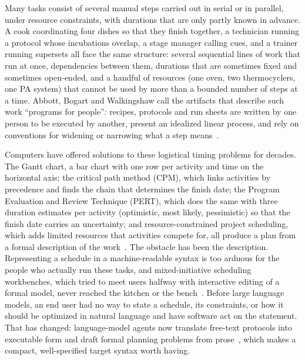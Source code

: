 \documentclass[10pt]{article}
\begin{document}
Many tasks consist of several manual steps carried out in serial or in parallel, under resource constraints, with durations that are only partly known in advance. A cook coordinating four dishes so that they finish together, a technician running a protocol whose incubations overlap, a stage manager calling cues, and a trainer running supersets all face the same structure: several sequential lines of work that run at once, dependencies between them, durations that are sometimes fixed and sometimes open-ended, and a handful of resources (one oven, two thermocyclers, one PA system) that cannot be used by more than a bounded number of steps at a time. Abbott, Bogart and Walkingshaw call the artifacts that describe such work ``programs for people'': recipes, protocols and run sheets are written by one person to be executed by another, present an idealized linear process, and rely on conventions for widening or narrowing what a step means~\cite{abbott2015programs}.

Computers have offered solutions to these logistical timing problems for decades. The Gantt chart, a bar chart with one row per activity and time on the horizontal axis; the critical path method (CPM), which links activities by precedence and finds the chain that determines the finish date; the Program Evaluation and Review Technique (PERT), which does the same with three duration estimates per activity (optimistic, most likely, pessimistic) so that the finish date carries an uncertainty; and resource-constrained project scheduling, which adds limited resources that activities compete for, all produce a plan from a formal description of the work~\cite{wilson2003gantt,kelley1959cpm,malcolm1959pert,brucker1999rcpsp}. The obstacle has been the description. Representing a schedule in a machine-readable syntax is too arduous for the people who actually run these tasks, and mixed-initiative scheduling workbenches, which tried to meet users halfway with interactive editing of a formal model, never reached the kitchen or the bench~\cite{hsu1993macmerl,norbis1996interactive}. Before large language models, an end user had no way to state a schedule, its constraints, or how it should be optimized in natural language and have software act on the statement. That has changed: language-model agents now translate free-text protocols into executable form and draft formal planning problems from prose~\cite{shi2024protocol,angelopoulos2026prompts,benyamin2025copilot}, which makes a compact, well-specified target syntax worth having.
\end{document}
